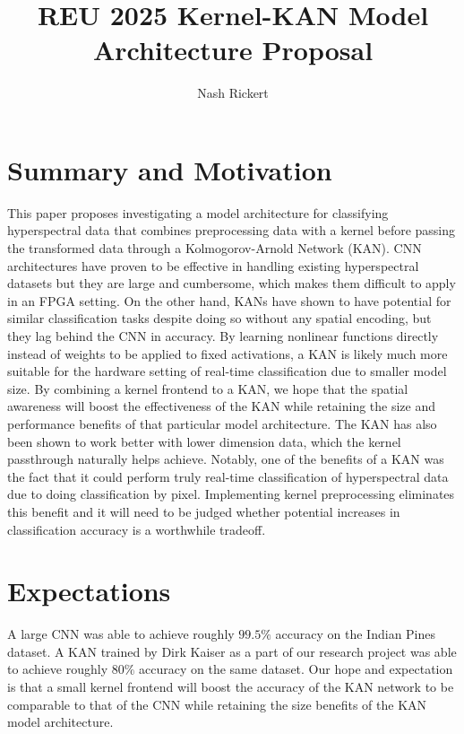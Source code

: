 \documentclass{article}
\title{REU 2025 Kernel-KAN Model Architecture Proposal}
\author{Nash Rickert}
\begin{document}
\maketitle
\section{Summary and Motivation}
This paper proposes investigating a model architecture for classifying hyperspectral data that combines preprocessing data with a kernel before passing the transformed data through a Kolmogorov-Arnold Network (KAN). CNN architectures have proven to be effective in handling existing hyperspectral datasets but they are large and cumbersome, which makes them difficult to apply in an FPGA setting. On the other hand, KANs have shown to have potential for similar classification tasks despite doing so without any spatial encoding, but they lag behind the CNN in accuracy. By learning nonlinear functions directly instead of weights to be applied to fixed activations, a KAN is likely much more suitable for the hardware setting of real-time classification due to smaller model size. By combining a kernel frontend to a KAN, we hope that the spatial awareness will boost the effectiveness of the KAN while retaining the size and performance benefits of that particular model architecture. The KAN has also been shown to work better with lower dimension data, which the kernel passthrough naturally helps achieve. Notably, one of the benefits of a KAN was the fact that it could perform truly real-time classification of hyperspectral data due to doing classification by pixel. Implementing kernel preprocessing eliminates this benefit and it will need to be judged whether potential increases in classification accuracy is a worthwhile tradeoff.


\section{Expectations}
A large CNN was able to achieve roughly $99.5\%$ accuracy on the Indian Pines dataset. A KAN trained by Dirk Kaiser as a part of our research project was able to achieve roughly $80\%$ accuracy on the same dataset. Our hope and expectation is that a small kernel frontend will boost the accuracy of the KAN network to be comparable to that of the CNN while retaining the size benefits of the KAN model architecture.
\end{document}
